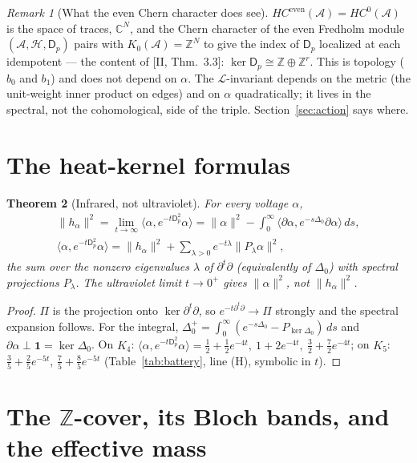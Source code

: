 \documentclass[11pt]{amsart}
\numberwithin{equation}{section}
\newtheorem{theorem}{Theorem}[section]
\theoremstyle{definition}
\theoremstyle{remark}
\newtheorem{remark}[theorem]{Remark}
\newcommand{\Z}{\mathbb{Z}}
\newcommand{\C}{\mathbb{C}}
\newcommand{\cA}{\mathcal{A}}
\newcommand{\cH}{\mathcal{H}}
\newcommand{\cL}{\mathcal{L}}
\newcommand{\Dp}{\mathsf{D}_p}
\newcommand{\HC}{\mathit{HC}}
\begin{document}
\begin{remark}[What the even Chern character does see]\label{rem:even}
$\HC^{\mathrm{even}}(\cA)=\HC^{0}(\cA)$ is the space of traces, $\C^{N}$, and the Chern
character of the even Fredholm module $(\cA,\cH,\Dp)$ pairs with $K_0(\cA)=\Z^{N}$ to give
the index of $\Dp$ localized at each idempotent --- the content of [II, Thm.~3.3]:
$\ker\Dp\cong\Z\oplus\Z^{r}$. This is topology ($b_0$ and $b_1$) and does not depend on
$\alpha$. The $\cL$-invariant depends on the metric (the unit-weight inner product on
edges) and on $\alpha$ quadratically; it lives in the spectral, not the cohomological, side
of the triple. Section~\ref{sec:action} says where.
\end{remark}

\section{The heat-kernel formulas}\label{sec:heat}

\begin{theorem}[Infrared, not ultraviolet]\label{thm:heat}
For every voltage $\alpha$,
\begin{gather*}
\|h_\alpha\|^{2}=\lim_{t\to\infty}\bigl\langle\alpha,e^{-t\Dp^{2}}\alpha\bigr\rangle
=\|\alpha\|^{2}-\int_0^{\infty}\bigl\langle\partial\alpha,e^{-s\Delta_0}\partial\alpha\bigr\rangle\,ds ,\\
\bigl\langle\alpha,e^{-t\Dp^{2}}\alpha\bigr\rangle=\|h_\alpha\|^{2}+\sum_{\lambda>0}e^{-t\lambda}\|P_\lambda\alpha\|^{2},
\end{gather*}
the sum over the nonzero eigenvalues $\lambda$ of $\partial^{t}\partial$ (equivalently of
$\Delta_0$) with spectral projections $P_\lambda$. The ultraviolet limit $t\to0^{+}$ gives
$\|\alpha\|^{2}$, not $\|h_\alpha\|^{2}$.
\end{theorem}

\begin{proof}
$\Pi$ is the projection onto $\ker\partial^{t}\partial$, so $e^{-t\partial^{t}\partial}\to\Pi$
strongly and the spectral expansion follows. For the integral,
$\Delta_0^{+}=\int_0^{\infty}(e^{-s\Delta_0}-P_{\ker\Delta_0})\,ds$ and $\partial\alpha\perp
\mathbf1=\ker\Delta_0$. On $K_4$: $\langle\alpha,e^{-t\Dp^{2}}\alpha\rangle=\frac12+\frac12e^{-4t},
\ 1+2e^{-4t},\ \frac32+\frac72e^{-4t}$; on $K_5$: $\frac35+\frac25e^{-5t}$,
$\frac75+\frac85e^{-5t}$ (Table~\ref{tab:battery}, line (H), symbolic in $t$).
\end{proof}

\section{The \texorpdfstring{$\Z$}{Z}-cover, its Bloch bands, and the effective mass}\label{sec:bloch}
\end{document}
